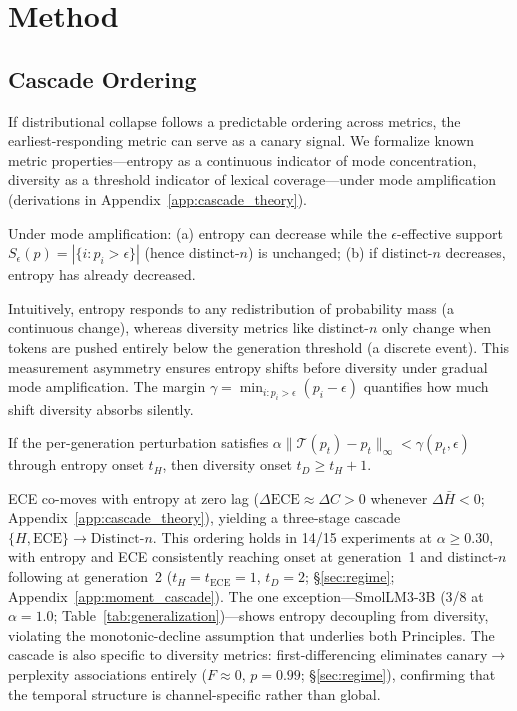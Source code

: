 \FloatBarrier
\section{Method}
\label{sec:method}

\subsection{Cascade Ordering}
\label{sec:cascade}

If distributional collapse follows a predictable ordering across metrics, the earliest-responding metric can serve as a canary signal.
We formalize known metric properties---entropy as a continuous indicator of mode concentration, diversity as a threshold indicator of lexical coverage---under mode amplification~\citep{shumailov2024curse,dohmatob2024tale} (derivations in Appendix~\ref{app:cascade_theory}).

\begin{designprinciple}\label{thm:entropy_leads}
Under mode amplification: \textup{(a)} entropy can decrease while the $\epsilon$-effective support $S_\epsilon(p) {=} |\{i: p_i > \epsilon\}|$ (hence distinct-$n$) is unchanged; \textup{(b)} if distinct-$n$ decreases, entropy has already decreased.
\end{designprinciple}

Intuitively, entropy responds to any redistribution of probability mass (a continuous change), whereas diversity metrics like distinct-$n$ only change when tokens are pushed entirely below the generation threshold (a discrete event).
This measurement asymmetry ensures entropy shifts before diversity under gradual mode amplification.
The margin $\gamma = \min_{i: p_i > \epsilon}(p_i - \epsilon)$ quantifies how much shift diversity absorbs silently.

\begin{designprinciple}\label{prop:div_lag}
If the per-generation perturbation satisfies $\alpha\|\mathcal{T}(p_t) - p_t\|_\infty < \gamma(p_t, \epsilon)$ through entropy onset $t_H$, then diversity onset $t_D \geq t_H + 1$.
\end{designprinciple}

ECE co-moves with entropy at zero lag ($\Delta\mathrm{ECE} \approx \Delta C > 0$ whenever $\Delta\bar{H} < 0$; Appendix~\ref{app:cascade_theory}), yielding a three-stage cascade $\{H, \mathrm{ECE}\} \to \mathrm{Distinct}$-$n$.
This ordering holds in 14/15 experiments at $\alpha \geq 0.30$, with entropy and ECE consistently reaching onset at generation~1 and distinct-$n$ following at generation~2 ($t_H{=}t_{\mathrm{ECE}}{=}1$, $t_D{=}2$; \S\ref{sec:regime}; Appendix~\ref{app:moment_cascade}).
The one exception---SmolLM3-3B (3/8 at $\alpha{=}1.0$; Table~\ref{tab:generalization})---shows entropy decoupling from diversity, violating the monotonic-decline assumption that underlies both Principles.
The cascade is also specific to diversity metrics: first-differencing eliminates canary$\to$perplexity associations entirely ($F{\approx}0$, $p{=}0.99$; \S\ref{sec:regime}), confirming that the temporal structure is channel-specific rather than global.

